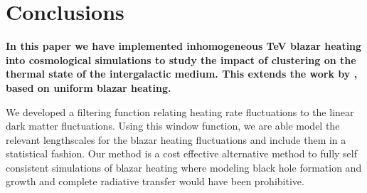 \documentclass[twocolumns]{emulateapj}
\newcommand\ALc[1]{{\color{red} \bf #1}} %
\begin{document}
{{}


 





\section{Conclusions}
\ALc{In this paper we  have implemented inhomogeneous TeV blazar heating into cosmological simulations to study the impact of clustering on the thermal state of the intergalactic medium. This extends the work by  \citet{2012ApJ...752...23C,2012MNRAS.423..149P}, based on uniform blazar heating.

We developed a filtering function relating heating rate fluctuations to the linear dark matter fluctuations. Using this window function, we are able model the relevant lengthscales for the blazar heating fluctuations and include them in a statistical fashion. Our method is a cost effective alternative method to fully self consistent simulations of blazar heating where modeling black hole formation and growth and complete radiative transfer would have been prohibitive. 




}}
\end{document}
